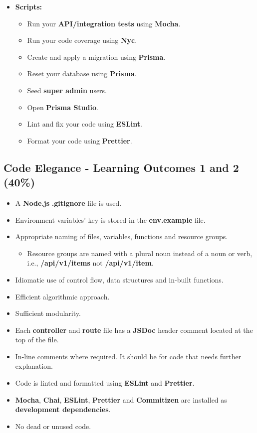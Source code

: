 \documentclass{article}
\begin{document}
\begin{itemize}
	\item \textbf{Scripts:}
	\begin{itemize}
		\item Run your \textbf{API/integration tests} using \textbf{Mocha}.
		\item Run your code coverage using \textbf{Nyc}.
		\item Create and apply a migration using \textbf{Prisma}.
		\item Reset your database using \textbf{Prisma}.
		\item Seed \textbf{super admin} users.
		\item Open \textbf{Prisma Studio}. 
		\item Lint and fix your code using \textbf{ESLint}.
		\item Format your code using \textbf{Prettier}.
	\end{itemize}
\end{itemize} 

\subsection*{Code Elegance - Learning Outcomes 1 and 2 (40\%)}
\begin{itemize}
	\item A \textbf{Node.js} \textbf{.gitignore} file is used.
	\item Environment variables' key is stored in the \textbf{env.example} file. 
	\item Appropriate naming of files, variables, functions and resource groups.
	\begin{itemize}
	  \item Resource groups are named with a plural noun instead of a noun or verb, i.e., \textbf{/api/v1/items} not \textbf{/api/v1/item}.
	\end{itemize}
	\item Idiomatic use of control flow, data structures and in-built functions.
	  \item Efficient algorithmic approach.
  \item Sufficient modularity.
  \item Each \textbf{controller} and \textbf{route} file has a \textbf{JSDoc} header comment located at the top of the file.
\item In-line comments where required. It should be for code that needs further explanation.
	\item Code is linted and formatted using \textbf{ESLint} and \textbf{Prettier}.
	\item \textbf{Mocha}, \textbf{Chai}, \textbf{ESLint}, \textbf{Prettier} and \textbf{Commitizen} are installed as \textbf{development dependencies}.	
	\item No dead or unused code.
\end{itemize}
\end{document}
